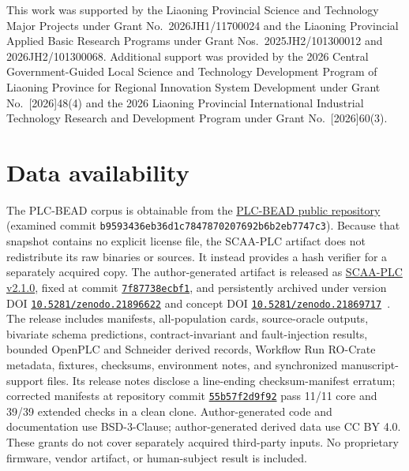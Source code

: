 \documentclass[a4paper,fleqn]{cas-dc}
\begin{document}
This work was supported by the Liaoning Provincial Science and Technology Major Projects under Grant No.~2026JH1/11700024 and the Liaoning Provincial Applied Basic Research Programs under Grant Nos.~2025JH2/101300012 and 2026JH2/101300068. Additional support was provided by the 2026 Central Government-Guided Local Science and Technology Development Program of Liaoning Province for Regional Innovation System Development under Grant No.~[2026]48(4) and the 2026 Liaoning Provincial International Industrial Technology Research and Development Program under Grant No.~[2026]60(3).

\section*{Data availability}

The PLC-BEAD corpus is obtainable from the \href{https://github.com/AICPS/PLCBEAD_PLCEmbed}{PLC-BEAD public repository} (examined commit \texttt{b9593436eb36d1c7847870207692b6b2eb7747c3}). Because that snapshot contains no explicit license file, the SCAA-PLC artifact does not redistribute its raw binaries or sources. It instead provides a hash verifier for a separately acquired copy. The author-generated artifact is released as \href{https://github.com/Mewtwoz/SCAA_PLC_ARTIFACT/releases/tag/v2.1.0}{SCAA-PLC v2.1.0}, fixed at commit \href{https://github.com/Mewtwoz/SCAA_PLC_ARTIFACT/commit/7f87738ecbf19c09d5d63bee99e6de86ac32bce1}{\texttt{7f87738ecbf1}}, and persistently archived under version DOI \href{https://doi.org/10.5281/zenodo.21896622}{\texttt{10.5281/zenodo.21896622}} and concept DOI \href{https://doi.org/10.5281/zenodo.21869717}{\texttt{10.5281/zenodo.21869717}}~\citep{scaa_plc_artifact_v2}. The release includes manifests, all-population cards, source-oracle outputs, bivariate schema predictions, contract-invariant and fault-injection results, bounded OpenPLC and Schneider derived records, Workflow Run RO-Crate metadata, fixtures, checksums, environment notes, and synchronized manuscript-support files. Its release notes disclose a line-ending checksum-manifest erratum; corrected manifests at repository commit \href{https://github.com/Mewtwoz/SCAA_PLC_ARTIFACT/commit/55b57f2d9f92d928daacb15e66c192c23f1e7775}{\texttt{55b57f2d9f92}} pass 11/11 core and 39/39 extended checks in a clean clone. Author-generated code and documentation use BSD-3-Clause; author-generated derived data use CC BY 4.0. These grants do not cover separately acquired third-party inputs. No proprietary firmware, vendor artifact, or human-subject result is included.
\end{document}
